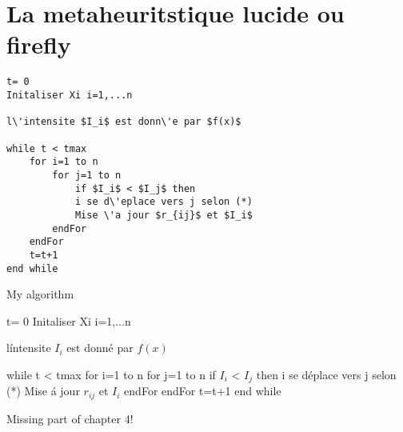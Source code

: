 \chapter{La metaheuritstique lucide ou firefly}


\begin{lstlisting}[style=MyListStyle]
t= 0
Initaliser Xi i=1,...n

l\'intensite $I_i$ est donn\'e par $f(x)$

while t < tmax
	for i=1 to n
		for j=1 to n
			if $I_i$ < $I_j$ then
			i se d\'eplace vers j selon (*)
			Mise \'a jour $r_{ij}$ et $I_i$
		endFor
	endFor
	t=t+1
end while

\end{lstlisting}

\begin{algorithm}
\caption{My algorithm}\label{euclid}
\begin{algorithmic}[1]
\Procedure{}{}
t= 0
Initaliser Xi i=1,...n

l\'intensite $I_i$ est donn\'e par $f(x)$

while t < tmax
	for i=1 to n
		for j=1 to n
			if $I_i$ < $I_j$ then
			i se d\'eplace vers j selon (*)
			Mise \'a jour $r_{ij}$ et $I_i$
		endFor
	endFor
	t=t+1
end while
\EndProcedure
\end{algorithmic}
\end{algorithm}


\LARGE Missing part of chapter 4!
